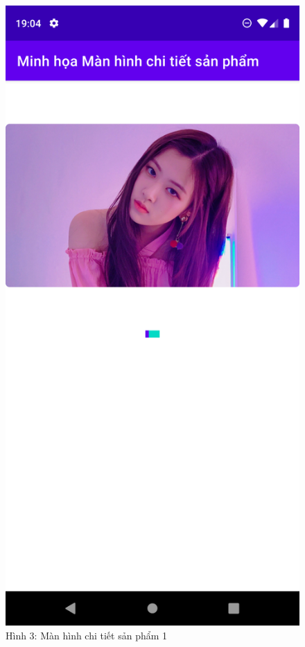 \documentclass{beamer}
\begin{document}
\begin{frame}
    \begin{columns}
        \begin{figure}
            \centering
            \includegraphics[height=0.7\textheight]{images/30.png}
            \caption{\centering\tiny{Hình 3: Màn hình chi tiết sản phẩm 1}}


\end{figure}
\end{columns}
\end{frame}
\end{document}

